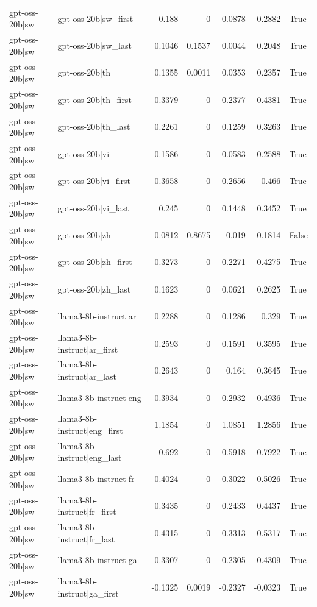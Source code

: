 \begin{table}
\begin{tabular}{l l r r r r l}
gpt-oss-20b|sw & gpt-oss-20b|sw_first & 0.188 & 0 & 0.0878 & 0.2882 & True \\
gpt-oss-20b|sw & gpt-oss-20b|sw_last & 0.1046 & 0.1537 & 0.0044 & 0.2048 & True \\
gpt-oss-20b|sw & gpt-oss-20b|th & 0.1355 & 0.0011 & 0.0353 & 0.2357 & True \\
gpt-oss-20b|sw & gpt-oss-20b|th_first & 0.3379 & 0 & 0.2377 & 0.4381 & True \\
gpt-oss-20b|sw & gpt-oss-20b|th_last & 0.2261 & 0 & 0.1259 & 0.3263 & True \\
gpt-oss-20b|sw & gpt-oss-20b|vi & 0.1586 & 0 & 0.0583 & 0.2588 & True \\
gpt-oss-20b|sw & gpt-oss-20b|vi_first & 0.3658 & 0 & 0.2656 & 0.466 & True \\
gpt-oss-20b|sw & gpt-oss-20b|vi_last & 0.245 & 0 & 0.1448 & 0.3452 & True \\
gpt-oss-20b|sw & gpt-oss-20b|zh & 0.0812 & 0.8675 & -0.019 & 0.1814 & False \\
gpt-oss-20b|sw & gpt-oss-20b|zh_first & 0.3273 & 0 & 0.2271 & 0.4275 & True \\
gpt-oss-20b|sw & gpt-oss-20b|zh_last & 0.1623 & 0 & 0.0621 & 0.2625 & True \\
gpt-oss-20b|sw & llama3-8b-instruct|ar & 0.2288 & 0 & 0.1286 & 0.329 & True \\
gpt-oss-20b|sw & llama3-8b-instruct|ar_first & 0.2593 & 0 & 0.1591 & 0.3595 & True \\
gpt-oss-20b|sw & llama3-8b-instruct|ar_last & 0.2643 & 0 & 0.164 & 0.3645 & True \\
gpt-oss-20b|sw & llama3-8b-instruct|eng & 0.3934 & 0 & 0.2932 & 0.4936 & True \\
gpt-oss-20b|sw & llama3-8b-instruct|eng_first & 1.1854 & 0 & 1.0851 & 1.2856 & True \\
gpt-oss-20b|sw & llama3-8b-instruct|eng_last & 0.692 & 0 & 0.5918 & 0.7922 & True \\
gpt-oss-20b|sw & llama3-8b-instruct|fr & 0.4024 & 0 & 0.3022 & 0.5026 & True \\
gpt-oss-20b|sw & llama3-8b-instruct|fr_first & 0.3435 & 0 & 0.2433 & 0.4437 & True \\
gpt-oss-20b|sw & llama3-8b-instruct|fr_last & 0.4315 & 0 & 0.3313 & 0.5317 & True \\
gpt-oss-20b|sw & llama3-8b-instruct|ga & 0.3307 & 0 & 0.2305 & 0.4309 & True \\
gpt-oss-20b|sw & llama3-8b-instruct|ga_first & -0.1325 & 0.0019 & -0.2327 & -0.0323 & True \\

\end{tabular}
\end{table}
